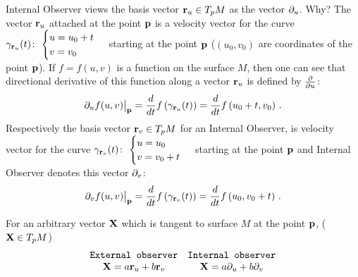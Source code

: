 \documentclass[12pt]{article}
\theoremstyle{theorem}
\numberwithin{equation}{section}
\begin{document}
Internal Observer views  the basis 
vector ${\bf r}_u\in T_pM$ as the vector
$\partial_u$.  Why?
The vector ${\bf r}_u$ attached at the point ${\bf p}$
is a  velocity vector
for the curve $\gamma_{{\bf r}_u} (t)\colon\, \begin{cases}
u=u_0+t\cr v=v_0\cr \end{cases}$ starting at the point ${\bf p}$ 
($(u_0,v_0)$  are coordinates of the point ${\bf p}$).
If $f=f(u,v)$ is a function on the surface $M$, then
one can see that directional derivative of this function
along a vector ${\bf r}_u$ is defined by ${\partial\over \partial u}$:
                \begin{equation*}
\partial_uf(u,v)\big\vert_{\bf p}=
{d\over dt} f\left(\gamma_{{\bf r}_u}(t)\right)=
{d\over dt} f\left(u_0+t,v_0\right)\,.
                \end{equation*}
Respectively the basis vector ${\bf r}_v\in T_pM$ 
for an Internal Observer, is velocity vector
for the curve $\gamma_{{\bf r}_v} (t)\colon\, \begin{cases}
u=u_0\cr v=v_0+t\cr \end{cases}$ starting at the point ${\bf p}$   
and Internal Observer denotes this vector $\partial_v$: 
  \begin{equation*}
\partial_vf(u,v)\big\vert_{\bf p}=
{d\over dt} f\left(\gamma_{{\bf r}_v}(t)\right)=
{d\over dt} f\left(u_0,v_0+t\right)\,.
                \end{equation*}


For an  arbitrary vector ${\bf X}$ which is tangent to surface $M$ at the point
${\bf p}$, (${\bf X}\in T_pM$) 
               \begin{equation*}
                \begin {matrix}
  \hbox{\tt External observer}    & \hbox{\tt Internal observer}\cr
   {\bf X}= a{\bf r}_u+b{\bf r}_v             &          {\bf X}=a\partial_u+b\partial_v\cr
              \end{matrix}
                  \end{equation*}
\end{document}
